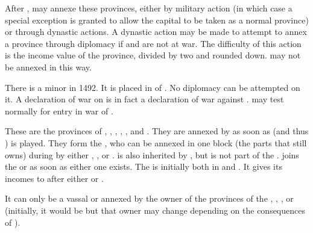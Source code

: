 \aparag[Disappearance] After , \SPA may
annexe these provinces, either by military action (in which case a
special exception is granted to allow the capital to be taken as a
normal province) or through dynastic actions.
\bparag\label{chSpecific:Belgium:Diplomatic Annexation} A dynastic action may
be made to attempt to annex a province through diplomacy if \SPA and
 are not at war. The difficulty of this action is the
income value of the province, divided by two and rounded
down.  may not be annexed in this way.


\label{chSpecific:Burgundy}
 There is a minor
 in 1492. It is placed in \EW of \HAB. No diplomacy can
be attempted on it.
\bparag A declaration of war on  is in fact a
declaration of war against \HAB.
\bparag \HAB may test normally for entry in war of .

 These are the provinces of
, , ,
, ,  and
. They are annexed by \SPA as soon as
 (and thus ) is
played. They form the , who can be annexed
in one block (the parts that \SPA still owns) during 
by either \AUS, \ENG, \FRA or \SPA.
\bparag {} is also inherited by \SPA, but is not
part of the .
\bparag {} joins the  or
 as soon as either one exists.
\bparag The  is initially both in  and
. It gives its incomes to \SPA after either
 or .

\label{chSpecific:Liege}
It can only be a vassal or annexed by the owner of the
provinces of the , \SPA, \AUS, \ENG or \FRA
(initially, it would be \SPA but that owner may change depending on the
consequences of ).

